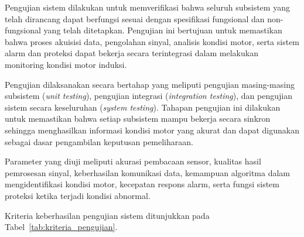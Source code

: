 \documentclass{elsinta}
\begin{document}
Pengujian sistem dilakukan untuk memverifikasi bahwa seluruh subsistem yang telah dirancang dapat berfungsi sesuai dengan spesifikasi fungsional dan non-fungsional yang telah ditetapkan. Pengujian ini bertujuan untuk memastikan bahwa proses akuisisi data, pengolahan sinyal, analisis kondisi motor, serta sistem alarm dan proteksi dapat bekerja secara terintegrasi dalam melakukan monitoring kondisi motor induksi.

Pengujian dilaksanakan secara bertahap yang meliputi pengujian masing-masing subsistem (\textit{unit testing}), pengujian integrasi (\textit{integration testing}), dan pengujian sistem secara keseluruhan (\textit{system testing}). Tahapan pengujian ini dilakukan untuk memastikan bahwa setiap subsistem mampu bekerja secara sinkron sehingga menghasilkan informasi kondisi motor yang akurat dan dapat digunakan sebagai dasar pengambilan keputusan pemeliharaan.

Parameter yang diuji meliputi akurasi pembacaan sensor, kualitas hasil pemrosesan sinyal, keberhasilan komunikasi data, kemampuan algoritma dalam mengidentifikasi kondisi motor, kecepatan respons alarm, serta fungsi sistem proteksi ketika terjadi kondisi abnormal.

Kriteria keberhasilan pengujian sistem ditunjukkan pada Tabel~\ref{tab:kriteria_pengujian}.
\end{document}
